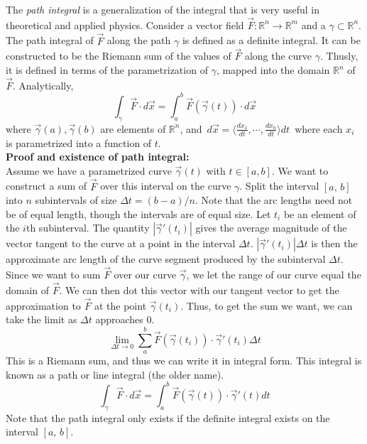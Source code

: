 \documentclass[12pt]{article}
\begin{document}
 

The \emph{path integral} is a generalization of the integral that is very useful in theoretical and applied physics. Consider a vector field $\vec{F}\!:\mathbb{R}^n\rightarrow\mathbb{R}^m$ and a  $\gamma\subset\mathbb{R}^n$. The path integral of $\vec{F}$ along the path $\gamma$ is defined as a definite integral. It can be constructed to be the Riemann sum of the values of $\vec{F}$ along the curve $\gamma$. Thusly, it is defined in terms of the parametrization of $\gamma$, mapped into the domain $\mathbb{R}^n$ of $\vec{F}$. Analytically,
$$\int_\gamma \vec{F}\cdot d\vec{x} = \int_a^b \vec{F}(\vec{\gamma}(t))\cdot d\vec{x}$$
where $\vec{\gamma}(a), \vec{\gamma}(b)$ are elements of $\mathbb{R}^n$, and\, $d\vec{x}=\langle\frac{dx_1}{dt},\cdots,\frac{dx_n}{dt}\rangle dt$\, where each $x_i$ is parametrized into a function of $t$.\\

\textbf{Proof and existence of path integral:}\\
Assume we have a parametrized curve $\vec{\gamma}(t)$ with $t\in[a,b]$. We want to construct a sum of $\vec{F}$ over this interval on the curve $\gamma$. Split the interval $[a,\,b]$ into $n$ subintervals of size $\Delta t=(b-a)/n$. Note that the arc lengths need not be of equal length, though the intervals are of equal size. Let $t_i$ be an element of the $i$th subinterval. The quantity $|\vec{\gamma}'(t_i)|$ gives the average magnitude of the vector tangent to the curve at a point in the interval $\Delta t$. $|\vec{\gamma}'(t_i)|\Delta t$ is then the approximate arc length of the curve segment produced by the subinterval $\Delta t$. Since we want to sum $\vec{F}$ over our curve $\vec{\gamma}$, we let the range of our curve equal the domain of $\vec{F}$. We can then dot this vector with our tangent vector to get the approximation to $\vec{F}$ at the point $\vec{\gamma}(t_i)$. Thus, to get the sum we want, we can take the limit as $\Delta t$ approaches 0.
$$\lim_{\Delta t\rightarrow 0}\sum_a^b \vec{F}(\vec{\gamma}(t_i))\cdot\vec{\gamma}'(t_i)\Delta t$$
This is a Riemann sum, and thus we can write it in integral form. This integral is known as a path or line integral (the older name).
$$\int_\gamma \vec{F}\cdot d\vec{x} = \int_a^b \vec{F}(\vec{\gamma}(t))\cdot\vec{\gamma}'(t)dt$$
Note that the path integral only exists if the definite integral exists on the interval $[a,\,b]$.\\
\end{document}
